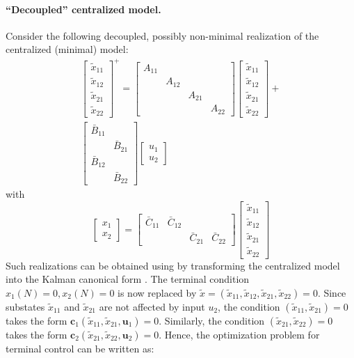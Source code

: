\documentclass[10pt, twocolumn]{article}
\newcommand{\bu}{\mathbf{u}}
\newcommand{\tx}{\tilde{x}}
\theoremstyle{definition}
\begin{document}
\paragraph{\textbf{``Decoupled'' centralized model.}}
Consider the following decoupled, possibly non-minimal realization of the centralized (minimal) model:
\begin{multline*} \begin{bmatrix}\tx_{11}\\\tx_{12}\\\tx_{21}\\\tx_{22}\end{bmatrix}^+ = \begin{bmatrix}A_{11}& & &\\&A_{12}& & \\&&A_{21}&\\&&&A_{22}\end{bmatrix}\begin{bmatrix}\tx_{11}\\\tx_{12}\\\tx_{21}\\\tx_{22}\end{bmatrix}+\\\begin{bmatrix}\bar{B}_{11}&\\&\bar{B}_{21}\\\bar{B}_{12}&\\&\bar{B}_{22}\end{bmatrix}\begin{bmatrix}u_1\\u_2\end{bmatrix}\end{multline*}
with
\[\begin{bmatrix}x_1\\x_2\end{bmatrix}= \begin{bmatrix}\bar{C
}_{11}& \bar{C}_{12}&&\\&&\bar{C}_{21}&\bar{C}_{22}\end{bmatrix}\begin{bmatrix}\tx_{11}\\\tx_{12}\\\tx_{21}\\ \tx_{22}\end{bmatrix}\]
Such realizations can be obtained using by transforming the centralized model into the Kalman canonical form \citep[p. 270]{antsaklis:michel:1997}. The terminal condition $x_1(N) = 0, x_2(N) = 0$ is now replaced by $\tx = (\tx_{11},\tx_{12},\tx_{21},\tx_{22}) = 0$. Since substates $\tx_{11}$ and $\tx_{21}$ are not affected by input $u_2$, the condition $(\tx_{11},\tx_{21}) = 0$ takes the form $\mathbf{c}_1(\tx_{11},\tx_{21},\bu_1) = 0$. Similarly, the condition $(\tx_{21},\tx_{22})= 0$ takes the form $\mathbf{c}_2(\tx_{21},\tx_{22},\bu_2) = 0$. Hence, the  optimization problem for terminal control can be written as:
\end{document}
